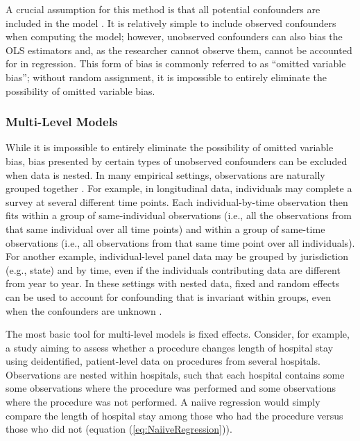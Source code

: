 \documentclass[12pt]{article}
\begin{document}
A crucial assumption for this method is that all potential confounders are included in the model \citep{cremieuxOmittedVariableBias2001}. It is relatively simple to include observed confounders when computing the model; however, unobserved confounders can also bias the OLS estimators and, as the researcher cannot observe them, cannot be accounted for in regression. This form of bias is commonly referred to as ``omitted variable bias''; without random assignment, it is impossible to entirely eliminate the possibility of omitted variable bias.

\subsubsection{Multi-Level Models}
\label{sec:MLM}

While it is impossible to entirely eliminate the possibility of omitted variable bias, bias presented by certain types of unobserved confounders can be excluded when data is nested. In many empirical settings, observations are naturally grouped together \citep{duncanHealthrelatedBehaviourContext1996}. For example, in longitudinal data, individuals may complete a survey at several different time points. Each individual-by-time observation then fits within a group of same-individual observations (i.e., all the observations from that same individual over all time points) and within a group of same-time observations (i.e., all observations from that same time point over all individuals). For another example, individual-level panel data may be grouped by jurisdiction (e.g., state) and by time, even if the individuals contributing data are different from year to year. In these settings with nested data, fixed and random effects can be used to account for confounding that is invariant within groups, even when the confounders are unknown \citep{leylandMultilevelModellingPublic2003}.

The most basic tool for multi-level models is fixed effects. Consider, for example, a study aiming to assess whether a procedure changes length of hospital stay using deidentified, patient-level data on procedures from several hospitals. Observations are nested within hospitals, such that each hospital contains some some observations where the procedure was performed and some observations where the procedure was not performed. A naiive regression would simply compare the length of hospital stay among those who had the procedure versus those who did not (equation (\ref{eq:NaiiveRegression})).
\end{document}
